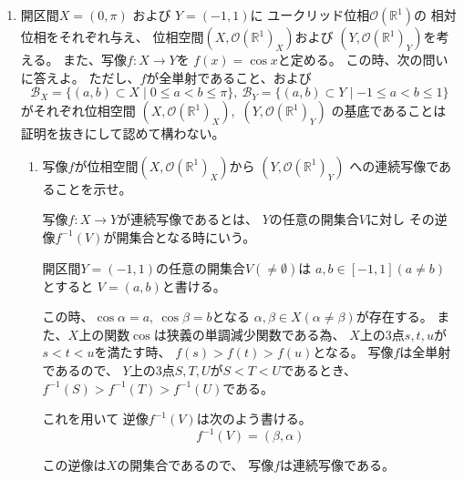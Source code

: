 \documentclass[12pt,b5paper]{ltjsarticle}
\begin{document}
\begin{enumerate}%
 \item
      開区間$X=(0, \pi)$ および $Y=(-1,1)$に
      ユークリッド位相$\mathscr{O}(\mathbb{R}^1)$の
      相対位相をそれぞれ与え、
      位相空間$(X,\mathscr{O}(\mathbb{R}^1)_X)$および
      $(Y,\mathscr{O}(\mathbb{R}^1)_Y)$を考える。
      また、写像$f:X\rightarrow Y$を
      $f(x)=\cos x$と定める。
      この時、次の問いに答えよ。
      ただし、$f$が全単射であること、および
      \begin{equation}
       \mathscr{B}_X=\{(a,b)\subset X \mid 0\leq a<b\leq \pi\},\
        \mathscr{B}_Y=\{(a,b)\subset Y \mid -1\leq a<b\leq 1\}
      \end{equation}
      がそれぞれ位相空間
      $(X,\mathscr{O}(\mathbb{R}^1)_X)$,\
      $(Y,\mathcal{O}(\mathbb{R}^1)_Y)$
      の基底であることは
      証明を抜きにして認めて構わない。

    \begin{enumerate}%
     \item
          写像$f$が位相空間$(X,\mathscr{O}(\mathbb{R}^1)_X)$から
          $(Y,\mathscr{O}(\mathbb{R}^1)_Y)$
          への連続写像であることを示せ。

          \dotfill
          
             写像$f:X\rightarrow Y$が連続写像であるとは、
             $Y$の任意の開集合$V$に対し
             その逆像$f^{-1}(V)$が開集合となる時にいう。

             \dotfill

             開区間$Y=(-1,1)$の任意の開集合$V (\ne \emptyset)$は
             $a,b \in [-1,1]　(a\ne b)$とすると $V=(a,b)$と書ける。

             この時、$\cos\alpha = a ,\ \cos\beta = b$となる
             $\alpha, \beta \in X (\alpha\ne\beta)$が存在する。
             また、$X$上の関数$\cos$は狭義の単調減少関数である為、
             $X$上の3点$s,t,u$が$s<t<u$を満たす時、
             $f(s)>f(t)>f(u)$となる。
             写像$f$は全単射であるので、
             $Y$上の3点$S,T,U$が$S<T<U$であるとき、
             $f^{-1}(S)>f^{-1}(T)>f^{-1}(U)$である。

             これを用いて
             逆像$f^{-1}(V)$は次のよう書ける。
             \begin{equation}
              f^{-1}(V) = (\beta, \alpha)
             \end{equation}

             この逆像は$X$の開集合であるので、
             写像$f$は連続写像である。


\end{enumerate}
\end{enumerate}
\end{document}
